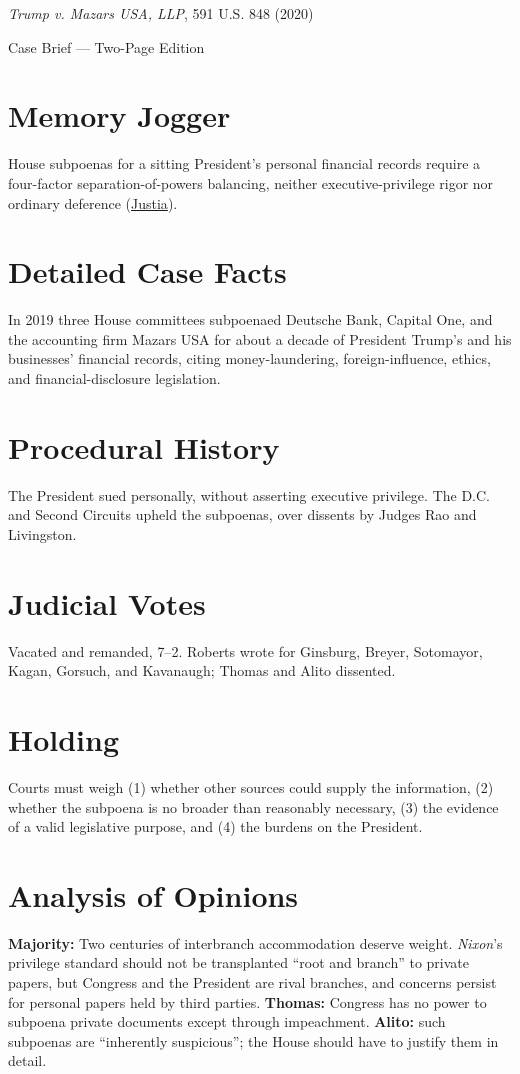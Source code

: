 \documentclass[12pt]{article}
\begin{document}
\begin{center}
{\LARGE \textit{Trump v. Mazars USA, LLP}, 591 U.S. 848 (2020)\par}
\vspace{0.5em}
{\large Case Brief --- Two-Page Edition\par}
\end{center}

\section{Memory Jogger}
House subpoenas for a sitting President's personal financial records require a four-factor separation-of-powers balancing, neither executive-privilege rigor nor ordinary deference (\href{https://supreme.justia.com/cases/federal/us/591/19-715/}{Justia}).

\section{Detailed Case Facts}
In 2019 three House committees subpoenaed Deutsche Bank, Capital One, and the accounting firm Mazars USA for about a decade of President Trump's and his businesses' financial records, citing money-laundering, foreign-influence, ethics, and financial-disclosure legislation.

\section{Procedural History}
The President sued personally, without asserting executive privilege. The D.C. and Second Circuits upheld the subpoenas, over dissents by Judges Rao and Livingston.

\section{Judicial Votes}
Vacated and remanded, 7--2. Roberts wrote for Ginsburg, Breyer, Sotomayor, Kagan, Gorsuch, and Kavanaugh; Thomas and Alito dissented.

\section{Holding}
Courts must weigh (1) whether other sources could supply the information, (2) whether the subpoena is no broader than reasonably necessary, (3) the evidence of a valid legislative purpose, and (4) the burdens on the President.

\section{Analysis of Opinions}
\textbf{Majority:} Two centuries of interbranch accommodation deserve weight. \textit{Nixon}'s privilege standard should not be transplanted ``root and branch'' to private papers, but Congress and the President are rival branches, and concerns persist for personal papers held by third parties. \textbf{Thomas:} Congress has no power to subpoena private documents except through impeachment. \textbf{Alito:} such subpoenas are ``inherently suspicious''; the House should have to justify them in detail.
\end{document}
